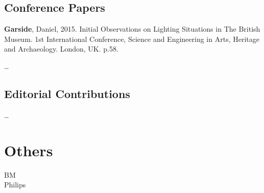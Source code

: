 \subsection*{Conference Papers}

\textbf{Garside}, Daniel, 2015. Initial Observations on Lighting Situations in The British Museum. 1st International Conference, Science and Engineering in Arts, Heritage and Archaeology. London, UK. p.58.

\noindent
\dots

\subsection*{Editorial Contributions}
\dots

\section{Others}
BM\\
Philips \\